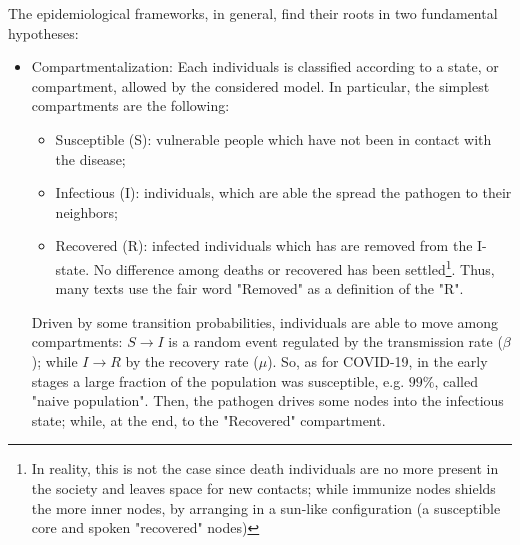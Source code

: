 \documentclass[a4paper,10pt,twoside]{book} %
\theoremstyle{definition}
\begin{document}
The epidemiological frameworks, in general, find their roots in two fundamental hypotheses:
\begin{itemize}
	\item Compartmentalization: Each individuals is classified according to a state, or compartment, allowed by the considered model. In particular, the simplest compartments are the following:
	\begin{itemize}
		\item Susceptible (S): vulnerable people which have not been in contact with the disease;
		\item Infectious (I): individuals, which are able the spread the pathogen to their neighbors;
		\item Recovered (R): infected individuals which has are removed from the I-state. No difference among deaths or recovered has been settled\footnote{In reality, this is not the case since death individuals are no more present in the society and leaves space for new contacts; while immunize nodes shields the more inner nodes, by arranging in a sun-like configuration (a susceptible core and spoken "recovered" nodes)}. Thus, many texts use the fair word "Removed" as a definition of the "R".
	\end{itemize}
	
	Driven by some transition probabilities, individuals are able to move among compartments: $S \rightarrow I$ is a random event regulated by the transmission rate ($\beta$); while $I \rightarrow R$ by the recovery rate ($\mu$). So, as for COVID-19, in the early stages a large fraction of the population was susceptible, e.g. $99\%$, called "naive population". Then, the pathogen drives some nodes into the infectious state; while, at the end, to the "Recovered" compartment.


\end{itemize}
\end{document}
